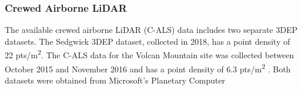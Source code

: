 \documentclass[remotesensing,article,submit,pdftex,moreauthors]{Definitions/mdpi}
\begin{document}
\subsubsection{Crewed Airborne LiDAR}
The available crewed airborne LiDAR (C-ALS) data includes two separate 3DEP datasets. The  Sedgwick  3DEP dataset, collected in 2018, has a point density of 22 pts/m\textsuperscript{2}. The C-ALS data for the Volcan Mountain site was collected between October 2015 and November 2016 and has a point density of 6.3 pts/m\textsuperscript{2} \citep{usgs_usgs_2016}. Both datasets were obtained from Microsoft's Planetary Computer \citep{us_geological_survey_3d_elevation_program_usgs_2023,planetary_computer}

\begin{table}[H]
\centering
\caption{Timeline of NAIP and UAVSAR acquisitions for both study sites.}
\label{tab:imagery_timeline_v2}
\end{table}
\end{document}
